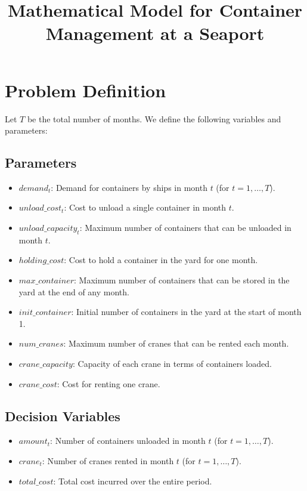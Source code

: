 \documentclass{article}
\begin{document}
\title{Mathematical Model for Container Management at a Seaport}
\author{}
\date{}
\maketitle

\section*{Problem Definition}

Let \( T \) be the total number of months. We define the following variables and parameters:

\subsection*{Parameters}
\begin{itemize}
    \item \( demand_{t} \): Demand for containers by ships in month \( t \) (for \( t = 1, \ldots, T \)).
    \item \( unload\_cost_{t} \): Cost to unload a single container in month \( t \).
    \item \( unload\_capacity_{t} \): Maximum number of containers that can be unloaded in month \( t \).
    \item \( holding\_cost \): Cost to hold a container in the yard for one month.
    \item \( max\_container \): Maximum number of containers that can be stored in the yard at the end of any month.
    \item \( init\_container \): Initial number of containers in the yard at the start of month 1.
    \item \( num\_cranes \): Maximum number of cranes that can be rented each month.
    \item \( crane\_capacity \): Capacity of each crane in terms of containers loaded.
    \item \( crane\_cost \): Cost for renting one crane.
\end{itemize}

\subsection*{Decision Variables}
\begin{itemize}
    \item \( amount_{t} \): Number of containers unloaded in month \( t \) (for \( t = 1, \ldots, T \)).
    \item \( crane_{t} \): Number of cranes rented in month \( t \) (for \( t = 1, \ldots, T \)).
    \item \( total\_cost \): Total cost incurred over the entire period.
\end{itemize}
\end{document}

